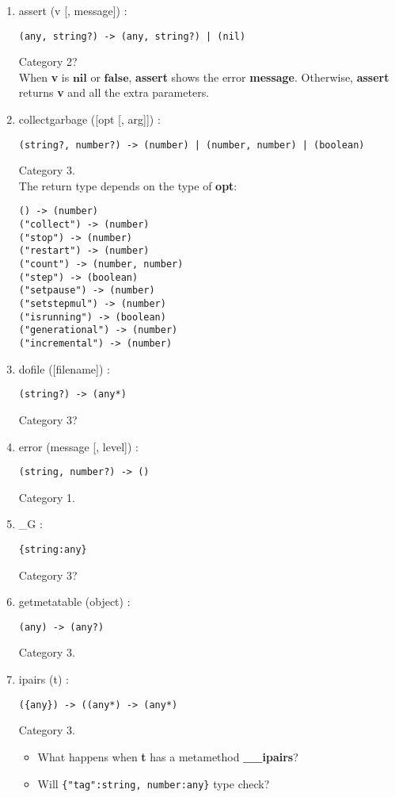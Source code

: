 \documentclass{paper}
\newcommand{\Nil}{\mathbf{nil}}
\newcommand{\False}{\mathbf{false}}
\begin{document}
\begin{enumerate}
\item assert (v [, message]) :
\begin{verbatim}
(any, string?) -> (any, string?) | (nil)
\end{verbatim}
Category 2?
\\
When \textbf{v} is $\Nil$ or $\False$, \textbf{assert}
shows the error \textbf{message}.
Otherwise, \textbf{assert} returns \textbf{v} and all the extra
parameters.
\item collectgarbage ([opt [, arg]]) :
\begin{verbatim}
(string?, number?) -> (number) | (number, number) | (boolean)
\end{verbatim}
Category 3.
\\
The return type depends on the type of \textbf{opt}:
\begin{verbatim}
() -> (number)
("collect") -> (number)
("stop") -> (number)
("restart") -> (number)
("count") -> (number, number)
("step") -> (boolean)
("setpause") -> (number)
("setstepmul") -> (number)
("isrunning") -> (boolean)
("generational") -> (number)
("incremental") -> (number)
\end{verbatim}
\item dofile ([filename]) :
\begin{verbatim}
(string?) -> (any*)
\end{verbatim}
Category 3?
\item error (message [, level]) :
\begin{verbatim}
(string, number?) -> ()
\end{verbatim}
Category 1.
\item \_G :
\begin{verbatim}
{string:any}
\end{verbatim}
Category 3?
\item getmetatable (object) :
\begin{verbatim}
(any) -> (any?)
\end{verbatim}
Category 3.
\item ipairs (t) :
\begin{verbatim}
({any}) -> ((any*) -> (any*)
\end{verbatim}
Category 3.
\\
\begin{itemize}
\item What happens when \textbf{t} has a metamethod \textbf{\_\_ipairs}?
\item Will \texttt{\{"tag":string, number:any\}} type check?

\end{itemize}
\end{enumerate}
\end{document}
